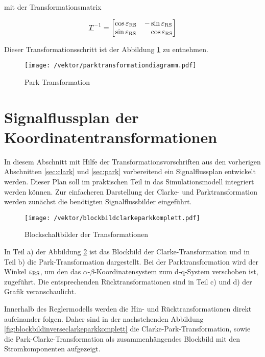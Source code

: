 mit der Transformationsmatrix

\begin{align}
	\underline{T}^{-1} =
	\begin{bmatrix}
		\cos{\varepsilon_{\mathrm{RS}}} & -\sin{\varepsilon_{\mathrm{RS}}} \\
		\sin{\varepsilon_{\mathrm{RS}}} & ~~~\cos{\varepsilon_{\mathrm{RS}}}
	\end{bmatrix}
	\label{parkmatrixinvers}
\end{align}

Dieser Transformationsschritt ist der Abbildung \ref{fig:parktransformationdiagramm} zu entnehmen.

\begin{figure}[h]
	\centering
	\texttt{[image: /vektor/parktransformationdiagramm.pdf]}
	\label{fig:parktransformationdiagramm}
	\caption{Park Transformation}
\end{figure}


\section{Signalflussplan der Koordinatentransformationen}\label{sec:signalflussplan}

In diesem Abschnitt mit Hilfe der Transformationsvorschriften aus den vorherigen Abschnitten \ref{sec:clark} und \ref{sec:park} vorbereitend ein Signalflussplan entwickelt werden.
Dieser Plan soll im praktischen Teil in das Simulationsmodell integriert werden können.
Zur einfacheren Darstellung der Clarke- und Parktransformation werden zunächst die benötigten Signalflussbilder eingeführt.

\begin{figure}[h]
	\centering
	\texttt{[image: /vektor/blockbildclarkeparkkomplett.pdf]}
	\label{fig:blockbildclarkeparkkomplett}
	\caption{Blockschaltbilder der Transformationen}
\end{figure}

In Teil a) der Abbildung \ref{fig:blockbildclarkeparkkomplett} ist das Blockbild der Clarke-Transformation und in Teil b) die Park-Transformation dargestellt. 
Bei der Parktransformation wird der Winkel $\varepsilon_{\mathrm{RS}}$, um den das $\alpha$-$\beta$-Koordinatensystem zum d-q-System verschoben ist, zugeführt.
Die entsprechenden Rücktransformationen sind in Teil c) und d) der Grafik veranschaulicht.

Innerhalb des Reglermodells werden die Hin- und Rücktransformationen direkt aufeinander folgen. Daher sind in der nachstehenden Abbildung \ref{fig:blockbildinverseclarkeparkkomplett} die Clarke-Park-Transformation, sowie die Park-Clarke-Transformation als zusammenhängendes Blockbild mit den Stromkomponenten aufgezeigt.

